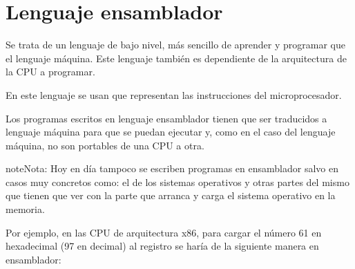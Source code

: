\documentclass[letterpaper,10pt,spanish]{sphinxmanual}
\begin{document}
\begin{sphinxVerbatim}[commandchars=\\\{\}]
          
\end{sphinxVerbatim}


\section{Lenguaje ensamblador}
\label{\detokenize{lenguajes_programacion_evolucion_historica:lenguaje-ensamblador}}
\sphinxAtStartPar
Se trata de un lenguaje de bajo nivel, más sencillo de aprender y programar que el lenguaje máquina. Este lenguaje también es dependiente de la arquitectura de la CPU a programar.

\sphinxAtStartPar
En este lenguaje se usan  que representan las instrucciones del microprocesador.

\sphinxAtStartPar
Los programas escritos en lenguaje ensamblador tienen que ser traducidos a lenguaje máquina para que se puedan ejecutar y, como en el caso del lenguaje máquina, no son portables de una CPU a otra.

\begin{sphinxadmonition}{note}{Nota:}
\sphinxAtStartPar
Hoy en día tampoco se escriben programas en ensamblador salvo en casos muy concretos como: el  de los sistemas operativos y otras partes del mismo que tienen que ver con la parte que arranca y carga el sistema operativo en la memoria.
\end{sphinxadmonition}

\sphinxAtStartPar
Por ejemplo, en las CPU de arquitectura x86, para cargar el número 61 en hexadecimal (97 en decimal) al registro  se haría de la siguiente manera en ensamblador:

\begin{sphinxVerbatim}[commandchars=\\\{\}]
  
\end{sphinxVerbatim}
\end{document}
